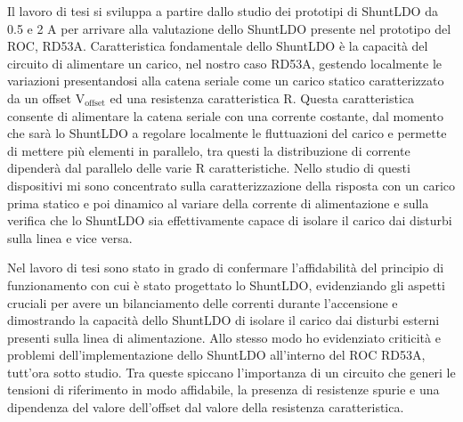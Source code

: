 \documentclass[a4paper,12pt,italian]{article}
\begin{document}
Il lavoro di tesi si sviluppa a partire dallo studio dei prototipi di ShuntLDO da 0.5 e 2 A per arrivare alla valutazione dello ShuntLDO presente nel prototipo del ROC, RD53A. 
Caratteristica fondamentale dello ShuntLDO è la capacità del circuito di alimentare un carico, nel nostro caso RD53A, gestendo localmente le variazioni presentandosi alla catena seriale come un carico statico caratterizzato da un offset $\mathrm{V_{offset}}$ ed una resistenza caratteristica R. 
Questa caratteristica consente di alimentare la catena seriale con una corrente costante, dal momento che sarà lo ShuntLDO a regolare localmente le fluttuazioni del carico e permette di mettere più elementi in parallelo, tra questi la distribuzione di corrente dipenderà dal parallelo delle varie R caratteristiche. 
Nello studio di questi dispositivi mi sono concentrato sulla caratterizzazione della risposta con un carico prima statico e poi dinamico al variare della corrente di alimentazione e sulla verifica che lo ShuntLDO sia effettivamente capace di isolare il carico dai disturbi sulla linea e vice versa. 

Nel lavoro di tesi sono stato in grado di confermare l'affidabilità del principio
di funzionamento con cui è stato progettato lo ShuntLDO, evidenziando
gli aspetti cruciali per avere un bilanciamento delle correnti durante l'accensione e dimostrando la capacità dello ShuntLDO di isolare il carico dai disturbi esterni 
presenti sulla linea di alimentazione. 
Allo stesso modo ho evidenziato criticità e problemi dell'implementazione dello ShuntLDO all'interno del ROC RD53A, tutt'ora sotto studio. Tra queste spiccano l'importanza di un circuito che generi le tensioni di riferimento in modo affidabile, la presenza di resistenze spurie e una dipendenza del valore dell'offset dal valore della resistenza caratteristica.
\end{document}
